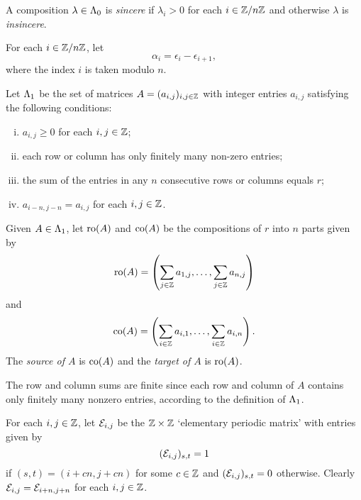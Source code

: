 \documentclass[a4paper, 11pt, twoside]{report}
\begin{document}
A composition $\lambda\in\Lambda_0{}$ is \emph{sincere} if $\lambda_i>0$ for each $i\in\mathbb{Z}/{n \mathbb{Z}}$ and otherwise $\lambda$ is \emph{insincere}.

For each $i\in\mathbb{Z}/{n \mathbb{Z}}$, let
\begin{equation*}
\alpha_i = \epsilon_i - \epsilon_{i+1},
\end{equation*}
where the index $i$ is taken modulo $n$.

\begin{definition}\label{def:matrices}
Let $\Lambda_1{}$ be the set of matrices $A=(a_{i,j})_{i,j\in\mathbb{Z}}$ with integer entries $a_{i,j}$ satisfying the following conditions: 
\begin{enumerate}[i.]
\item
$a_{i,j}\geq 0$ for each $i,j\in\mathbb{Z}$;
\item
each row or column has only finitely many non-zero entries;
\item
the sum of the entries in any $n$ consecutive rows or columns equals $r$;
\item
$a_{i-n,j-n}=a_{i,j}$ for each $i,j\in\mathbb{Z}$.
\end{enumerate}
\end{definition}

\begin{definition}\label{def:source-target}
Given $A\in\Lambda_1{}$, let $\operatorname{ro}(A)$ and $\operatorname{co}(A)$ be the compositions of $r$ into $n$ parts given by
\begin{equation*}
\operatorname{ro}(A) = \left( \sum_{j\in\mathbb{Z}}a_{1,j}, \ldots, \sum_{j\in\mathbb{Z}} a_{n,j}\right)
\end{equation*}
and
\begin{equation*}
\operatorname{co}(A) = \left( \sum_{i\in\mathbb{Z}} a_{i,1}, \ldots, \sum_{i\in\mathbb{Z}} a_{i,n}\right).
\end{equation*}
The \emph{source of $A$} is $\operatorname{co}(A)$ and the \emph{target of $A$} is $\operatorname{ro}(A)$.
\end{definition}

The row and column sums are finite since each row and column of $A$ contains only finitely many nonzero entries, according to the definition of $\Lambda_1{}$.

	For each $i,j\in\mathbb{Z}$, let $\mathcal{E}_{i,j}$ be the $\mathbb{Z}\times\mathbb{Z}$ `elementary periodic matrix' with entries given by
\begin{equation*}
(\mathcal{E}_{i,j})_{s,t}=1
\end{equation*}
if $(s,t) = (i+cn,j+cn)$ for some $c\in\mathbb{Z}$ and $(\mathcal{E}_{i,j})_{s,t}=0$ otherwise. Clearly $\mathcal{E}_{i,j} = \mathcal{E}_{i+n,j+n}$ for each $i,j\in\mathbb{Z}$.
\end{document}
